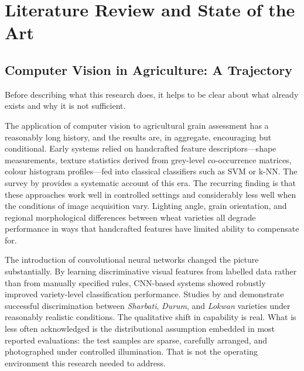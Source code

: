 
\chapter{Literature Review and State of the Art}\doublespacing
\label{Chapter3}

\section{Computer Vision in Agriculture: A Trajectory}

Before describing what this research does, it helps to be clear about what already exists and why it is not sufficient.

The application of computer vision to agricultural grain assessment has a reasonably long history, and the results are, in aggregate, encouraging but conditional. Early systems relied on handcrafted feature descriptors---shape measurements, texture statistics derived from grey-level co-occurrence matrices, colour histogram profiles---fed into classical classifiers such as SVM or k-NN. The survey by \cite{Lingwal2021} provides a systematic account of this era. The recurring finding is that these approaches work well in controlled settings and considerably less well when the conditions of image acquisition vary. Lighting angle, grain orientation, and regional morphological differences between wheat varieties all degrade performance in ways that handcrafted features have limited ability to compensate for.

The introduction of convolutional neural networks changed the picture substantially. By learning discriminative visual features from labelled data rather than from manually specified rules, CNN-based systems showed robustly improved variety-level classification performance. Studies by \cite{Laabassi2021} and \cite{Yasar2024} demonstrate successful discrimination between \textit{Sharbati}, \textit{Durum}, and \textit{Lokwan} varieties under reasonably realistic conditions. The qualitative shift in capability is real. What is less often acknowledged is the distributional assumption embedded in most reported evaluations: the test samples are sparse, carefully arranged, and photographed under controlled illumination. That is not the operating environment this research needed to address.

